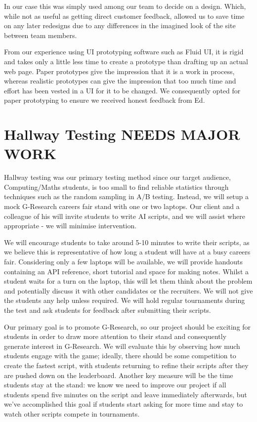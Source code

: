 In our case this was simply used among our team to decide on a design. Which, while not as useful as getting direct customer feedback, allowed us to save time on any later redesigns due to any differences in the imagined look of the site between team members. 

From our experience using UI prototyping software such as Fluid UI, it is rigid and takes only a little less time to create a prototype than drafting up an actual web page. Paper prototypes give the impression that it is a work in process, whereas realistic prototypes can give the impression that too much time and effort has been vested in a UI for it to be changed. We consequently opted for paper prototyping to ensure we received honest feedback from Ed.

\section{Hallway Testing \bf NEEDS MAJOR WORK}
Hallway testing was our primary testing method since our target audience, Computing/Maths students, is too small to find reliable statistics through techniques such as the random sampling in A/B testing. Instead, we will setup a mock G-Research careers fair stand with one or two laptops. Our client and a colleague of his will invite students to write AI scripts, and we will assist where appropriate - we will minimise intervention.

We will encourage students to take around 5-10 minutes to write their scripts, as we believe this is representative of how long a student will have at a busy careers fair. Considering only a few laptops will be available, we will provide handouts containing an API reference, short tutorial and space for making notes. Whilst a student waits for a turn on the laptop, this will let them think about the problem and potentially discuss it with other candidates or the recruiters. We will not give the students any help unless required. We will hold regular tournaments during the test and ask students for feedback after submitting their scripts. 

Our primary goal is to promote G-Research, so our project should be exciting for students in order to draw more attention to their stand and consequently generate interest in G-Research. We will evaluate this by observing how much students engage with the game; ideally, there should be some competition to create the fastest script, with students returning to refine their scripts after they are pushed down on the leaderboard. Another key measure will be the time students stay at the stand: we know we need to improve our project if all students spend five minutes on the script and leave immediately afterwards, but we've accomplished this goal if students start asking for more time and stay to watch other scripts compete in tournaments.

